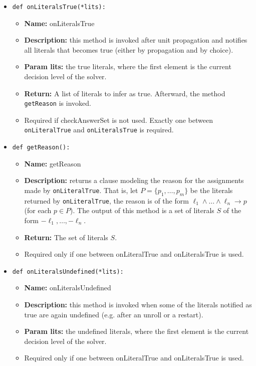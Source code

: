 \documentclass[a4paper,12pt]{article}
\begin{document}
\begin{itemize}
		\item \texttt{def onLiteralsTrue(*lits):}
		\begin{itemize}
			\item \textbf{Name:} onLiteralsTrue
			\item \textbf{Description:} this method is invoked after unit propagation and notifies all literals that becomes true (either by propagation and by choice).
			\item \textbf{Param lits:} the true literals, where the first element is the current decision level of the solver.
			\item \textbf{Return:} A list of literals to infer as true. Afterward, the method \texttt{getReason} is invoked.
			\item Required if checkAnswerSet is not used. Exactly one between \texttt{onLiteralTrue} and \texttt{onLiteralsTrue} is required.
		\end{itemize}

		\item \texttt{def getReason():}
		\begin{itemize}
			\item \textbf{Name:} getReason
			\item \textbf{Description:} returns a clause modeling the reason for the assignments made by \texttt{onLiteralTrue}. That is, let $P=\{p_1, \ldots, p_m\}$ be the literals returned by \texttt{onLiteralTrue}, the reason is of the form $\ell_1 \land \ldots \land \ell_n \rightarrow p$ (for each $p \in P$). The output of this method is a set of literals $S$ of the form $-\ell_1, \ldots, -\ell_n$.
			\item \textbf{Return:} The set of literals $S$.					
			\item Required only if one between onLiteralTrue and onLiteralsTrue is used.
		\end{itemize}
									
		\item \texttt{def onLiteralsUndefined(*lits):}
		\begin{itemize}
			\item \textbf{Name:} onLiteralsUndefined
			\item \textbf{Description:} this method is invoked when some of the literals notified as true are again undefined (e.g. after an unroll or a restart).
			\item \textbf{Param lits:} the undefined literals, where the first element is the current decision level of the solver.
			\item Required only if one between onLiteralTrue and onLiteralsTrue is used.
		\end{itemize}


\end{itemize}
\end{document}
